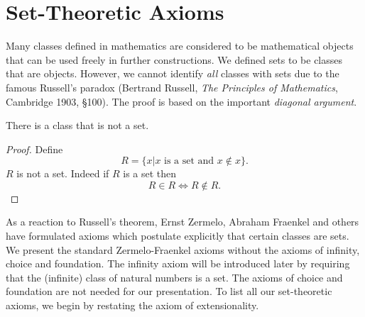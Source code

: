 \documentclass{article}
\begin{document}
\section{Set-Theoretic Axioms}

Many classes defined in mathematics are considered to be
mathematical objects that can be used freely in further constructions.
We defined sets to be classes that are objects. However, we cannot
identify {\em all} classes with sets due to the famous 
Russell's paradox (Bertrand Russell,
{\em The Principles of Mathematics}, Cambridge 1903, {\S}100).
The proof is based on the important {\em diagonal argument}.

\begin{forthel}

\begin{theorem}[Russell]
There is a class that is not a set.
\end{theorem}
\begin{proof}
Define $$R = \{x |\text{$x$ is a set and $x \notin x$}\}.$$
$R$ is not a set.
Indeed if $R$ is a set then $$R \in R \iff R \notin R.$$
\end{proof}
\end{forthel}

As a reaction to Russell's theorem, Ernst Zermelo, Abraham
Fraenkel and others have formulated axioms which 
postulate explicitly that certain classes are sets. We
present the standard Zermelo-Fraenkel axioms without
the axioms of infinity, choice and foundation. The infinity
axiom will be introduced later by requiring that the 
(infinite) class
of natural numbers is a set. The axioms of choice 
and foundation are not needed for our presentation.
To list all our set-theoretic axioms, we begin by restating
the axiom of extensionality.
\end{document}
